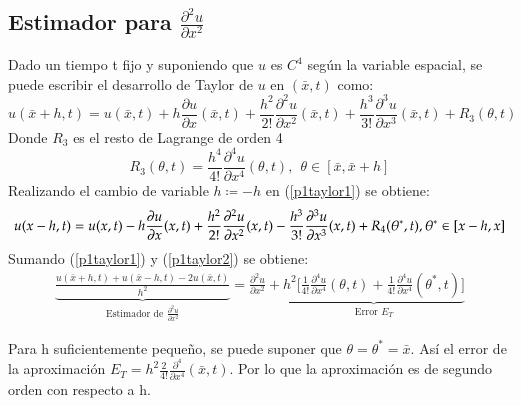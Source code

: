 \documentclass{endm}
\begin{document}
\subsection{Estimador para \texorpdfstring{$\frac{\partial^2u}{\partial x^2}$}{du/dx} }
Dado un tiempo t fijo y suponiendo que $u$ es $C^{4}$ según la variable espacial, se puede escribir el desarrollo de Taylor de $u$ en $(\bar{x},t)$ como: 
\begin{equation} \label{p1taylor1}
   u(\bar{x}+h,t) = u(\bar{x},t) + h\frac{\partial u}{\partial x}(\bar{x},t) +
   \frac{h^2}{2!}\frac{\partial^{2} u}{\partial x^2}(\bar{x},t) +
   \frac{h^3}{3!}\frac{\partial^3u}{\partial x^{3}}(\bar{x},t) + R_3(\theta,t)
\end{equation} 
Donde $R_3$ es el resto de Lagrange de orden 4 \cite[p. 348]{apostol}
\begin{equation*}
R_3(\theta,t) = \frac{h^4}{4!}\frac{\partial^4u}{\partial x^4}(\theta,t), \ \ \theta \in [\bar{x}, \bar{x}+h]
\end{equation*}
Realizando el cambio de variable $h \coloneqq -h$ en (\ref{p1taylor1}) se obtiene: 
\begin{equation} \label{p1taylor2} 
   u(\bar{x}-h,t) = u(\bar{x},t) - h\frac{\partial u}{\partial x}(\bar{x},t) +
   \frac{h^2}{2!}\frac{\partial^2 u}{\partial x^2}(\bar{x},t)
   -\frac{h^3}{3!}\frac{\partial^3u}{\partial x^3}(\bar{x},t) + R_4(\theta^*,t), \\
   \theta^* \in [\bar{x}-h, \bar{x}]
\end{equation} 
Sumando (\ref{p1taylor1}) y (\ref{p1taylor2}) se obtiene:
\begin{align*}
 \underbrace{\frac{u(\bar{x}+h,t) + u(\bar{x}-h,t) -2u(\bar{x},t)}{h^2}}_{\text{Estimador de $\frac{\partial^2 u}{\partial x^2}$}} = \frac{\partial^2u}{\partial x^2}+\underbrace{h^2\bigg[\frac{1}{4!}\frac{\partial^4u}{\partial x^4}(\theta,t) +\frac{1}{4!}\frac{\partial^4u}{\partial x^4}(\theta^*,t)\bigg]}_{\text{Error $E_T$}}
\end{align*}

Para h suficientemente pequeño, se puede suponer que $\theta = \theta^* = \bar{x}$. Así el error de la aproximación $E_T = h^2\frac{2}{4!}\frac{\partial^4}{\partial x^4}(\bar{x},t)$.  Por lo que la aproximación es de segundo orden con respecto a h. \\
\end{document}
